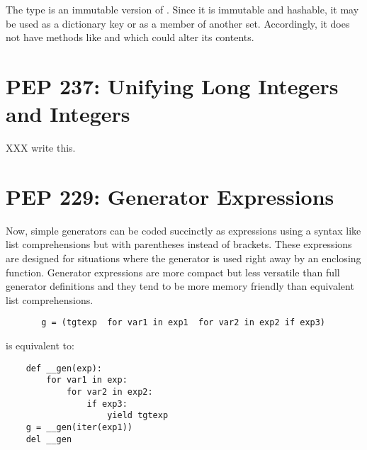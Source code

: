 \documentclass{howto}
\begin{document}
The type  is an immutable version of .
Since it is immutable and hashable, it may be used as a dictionary key or
as a member of another set.  Accordingly, it does not have methods
like  and  which could alter its contents.


\begin{seealso}
\end{seealso}

\section{PEP 237: Unifying Long Integers and Integers}

XXX write this.

\section{PEP 229: Generator Expressions}

Now, simple generators can be coded succinctly as expressions using a syntax
like list comprehensions but with parentheses instead of brackets.  These
expressions are designed for situations where the generator is used right
away by an enclosing function.  Generator expressions are more compact but
less versatile than full generator definitions and they tend to be more memory
friendly than equivalent list comprehensions.
       
\begin{verbatim}
       g = (tgtexp  for var1 in exp1  for var2 in exp2 if exp3)
\end{verbatim}
       
is equivalent to:

\begin{verbatim}
    def __gen(exp):
        for var1 in exp:
            for var2 in exp2:
                if exp3:
                    yield tgtexp
    g = __gen(iter(exp1))
    del __gen
\end{verbatim}
\end{document}

